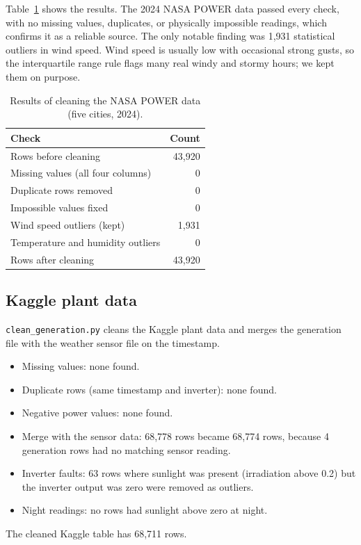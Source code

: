 \documentclass[11pt,a4paper]{article}
\begin{document}
Table~\ref{tab:nasa_cleaning} shows the results. The 2024 NASA POWER data passed every check, with no missing values, duplicates, or physically impossible readings, which confirms it as a reliable source. The only notable finding was 1,931 statistical outliers in wind speed. Wind speed is usually low with occasional strong gusts, so the interquartile range rule flags many real windy and stormy hours; we kept them on purpose.
 
\begin{table}[h]
\centering
\begin{tabular}{lr}
\hline
\textbf{Check} & \textbf{Count} \\
\hline
Rows before cleaning & 43,920 \\
Missing values (all four columns) & 0 \\
Duplicate rows removed & 0 \\
Impossible values fixed & 0 \\
Wind speed outliers (kept) & 1,931 \\
Temperature and humidity outliers & 0 \\
Rows after cleaning & 43,920 \\
\hline
\end{tabular}
\caption{Results of cleaning the NASA POWER data (five cities, 2024).}
\label{tab:nasa_cleaning}
\end{table}
 


\subsection{Kaggle plant data}
\texttt{clean\_generation.py} cleans the Kaggle plant data and merges the
generation file with the weather sensor file on the timestamp.
\begin{itemize}
  \item Missing values: none found.
  \item Duplicate rows (same timestamp and inverter): none found.
  \item Negative power values: none found.
  \item Merge with the sensor data: 68,778 rows became 68,774 rows,
        because 4 generation rows had no matching sensor reading.
  \item Inverter faults: 63 rows where sunlight was present
        (irradiation above 0.2) but the inverter output was zero were
        removed as outliers.
  \item Night readings: no rows had sunlight above zero at night.
\end{itemize}
The cleaned Kaggle table has 68,711 rows.
\end{document}
